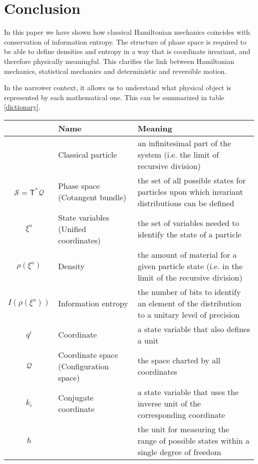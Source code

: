 \documentclass[11pt]{article}
\begin{document}
\section{Conclusion}

In this paper we have shown how classical Hamiltonian mechanics coincides with conservation of information entropy. The structure of phase space is required to be able to define densities and entropy in a way that is coordinate invariant, and therefore physically meaningful. This clarifies the link between Hamiltonian mechanics, statistical mechanics and deterministic and reversible motion.

In the narrower context, it allows us to understand what physical object is represented by each mathematical one. This can be summarized in table \ref{dictionary}.
\begin{table}[h]
	\centering
	\begin{tabular}{c p{} p{} }
		& Name & Meaning\\ 
		\hline 
		& Classical particle & an infinitesimal part of the system (i.e. the limit of recursive division) \\ 
		$\mathcal{S} =\mathsf{T}^*\mathcal{Q}$ & Phase space \newline (Cotangent bundle) & the set of all possible states for particles upon which invariant distributions can be defined \\
		$\xi^a$ & State variables \newline (Unified coordinates) & the set of variables needed to identify the state of a particle \\ 
		$\rho(\xi^a)$ & Density & the amount of material for a given particle state (i.e. in the limit of the recursive division)\\ 
		$I(\rho(\xi^a))$ & Information entropy & the number of bits to identify an element of the distribution to a unitary level of precision\\ 
		$q^i$ & Coordinate & a state variable that also defines a unit \\
		$\mathcal{Q}$ & Coordinate space \newline (Configuration space) & the space charted by all coordinates \\
		$k_i$ & Conjugate coordinate & a state variable that uses the inverse unit of the corresponding coordinate \\
		$\hbar$ & & the unit for measuring the range of possible states within a single degree of freedom \\

\end{tabular}
\end{table}
\end{document}
